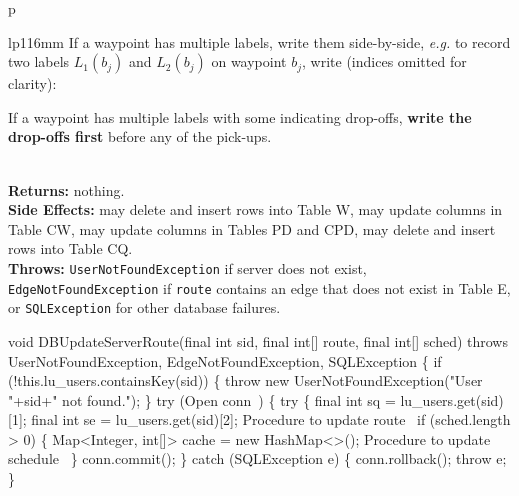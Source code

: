 \begin{tabular}{p{\textwidth}}
\begin{tabular}{lp{116mm}}
If a waypoint has multiple labels, write them side-by-side, \textit{e.g.}
to record two labels $L_1(b_j)$ and $L_2(b_j)$ on waypoint $b_j$, write
(indices omitted for clarity):


If a waypoint has multiple labels with some indicating drop-offs, \textbf{write
the drop-offs first} before any of the pick-ups.
\end{tabular}\\
\textbf{Returns:} nothing.\\
\textbf{Side Effects:} may delete and insert rows into Table W, may
update columns in Table CW, may update columns in Tables PD and CPD,
may delete and insert rows into Table CQ.\\
\textbf{Throws:} {\tt{}UserNotFoundException} if server does not exist,
{\tt{}EdgeNotFoundException} if {\tt{}route} contains an edge that does not exist in
Table E, or {\tt{}SQLException} for other database failures.\\
\bottomrule
\end{tabular}
\nwenddocs{}\endmoddef{}
void DBUpdateServerRoute(final int sid, final int[] route, final int[] sched)
throws UserNotFoundException, EdgeNotFoundException, SQLException \{
  if (!this.lu_users.containsKey(sid)) \{
    throw new UserNotFoundException("User "+sid+" not found.");
  \}
  try (\LA{}Open \code{}conn\edoc{}~{\nwtagstyle{}}\RA{}) \{
    try \{
      final int sq = lu_users.get(sid)[1];
      final int se = lu_users.get(sid)[2];
      \LA{}Procedure to update route~{\nwtagstyle{}}\RA{}
      if (sched.length > 0) \{
        Map<Integer, int[]> cache = new HashMap<>();
        \LA{}Procedure to update schedule~{\nwtagstyle{}}\RA{}
      \}
      conn.commit();
    \} catch (SQLException e) \{
      conn.rollback();
      throw e;
    \}
